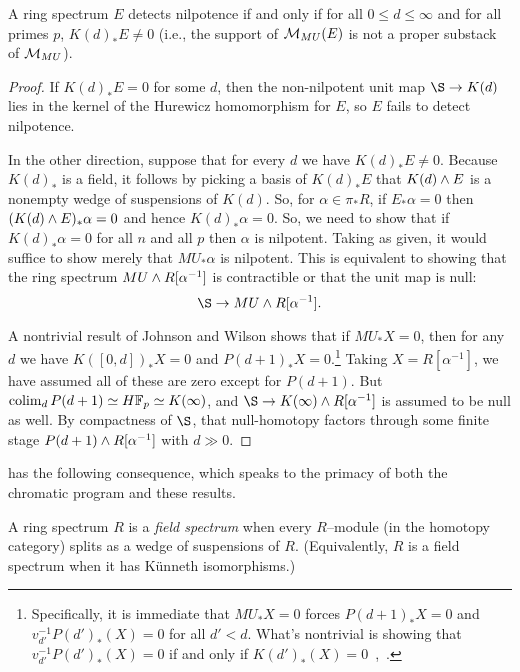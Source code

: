 \begin{corollary}\label{LocalNilpotenceDetection}
A ring spectrum $E$ detects nilpotence if and only if for all $0 \le d \le \infty$ and for all primes $p$, $K(d)_* E \ne 0$ (i.e., the support of $\mathcal{M}_{MU}(E)$ is not a proper substack of $\mathcal{M}_{MU}$).
\end{corollary}
\begin{proof}
If $K(d)_* E = 0$ for some $d$, then the non-nilpotent unit map $\S \to K(d)$ lies in the kernel of the Hurewicz homomorphism for $E$, so $E$ fails to detect nilpotence.

In the other direction, suppose that for every $d$ we have $K(d)_* E \ne 0$.  Because $K(d)_*$ is a field, it follows by picking a basis of $K(d)_* E$ that $K(d) \wedge E$ is a nonempty wedge of suspensions of $K(d)$.  So, for $\alpha \in \pi_* R$, if $E_* \alpha = 0$ then $(K(d) \wedge E)_* \alpha = 0$ and hence $K(d)_* \alpha = 0$.  So, we need to show that if $K(d)_* \alpha = 0$ for all $n$ and all $p$ then $\alpha$ is nilpotent.  Taking  as given, it would suffice to show merely that $MU_* \alpha$ is nilpotent.  This is equivalent to showing that the ring spectrum $MU \wedge R[\alpha^{-1}]$ is contractible or that the unit map is null: \[\S \to MU \sm R[\alpha^{-1}].\]

A nontrivial result of Johnson and Wilson shows that if $MU_* X = 0$, then for any $d$ we have $K([0, d])_* X = 0$ and $P(d+1)_* X = 0$.\footnote{Specifically, it is immediate that $MU_* X = 0$ forces $P(d+1)_* X = 0$ and $v_{d'}^{-1} P(d')_*(X) = 0$ for all $d' < d$.  What's nontrivial is showing that $v_{d'}^{-1} P(d')_*(X) = 0$ if and only if $K(d')_*(X) = 0$~\cite[Theorem 2.1.a]{RavenelLocalizationWRTPeriodic},~\cite[Section 3]{JohnsonWilson}.}  Taking $X = R[\alpha^{-1}]$, we have assumed all of these are zero except for $P(d+1)$.  But $\colim_d P(d+1) \simeq \HFp \simeq K(\infty)$, and $\S \to K(\infty) \sm R[\alpha^{-1}]$ is assumed to be null as well.  By compactness of $\S$, that null-homotopy factors through some finite stage $P(d+1) \wedge R[\alpha^{-1}]$ with $d \gg 0$.
\end{proof}

 has the following consequence, which speaks to the primacy of both the chromatic program and these results.

\begin{definition}
A ring spectrum $R$ is a \textit{field spectrum} when every $R$--module (in the homotopy category) splits as a wedge of suspensions of $R$.  (Equivalently, $R$ is a field spectrum when it has K\"unneth isomorphisms.)
\end{definition}

